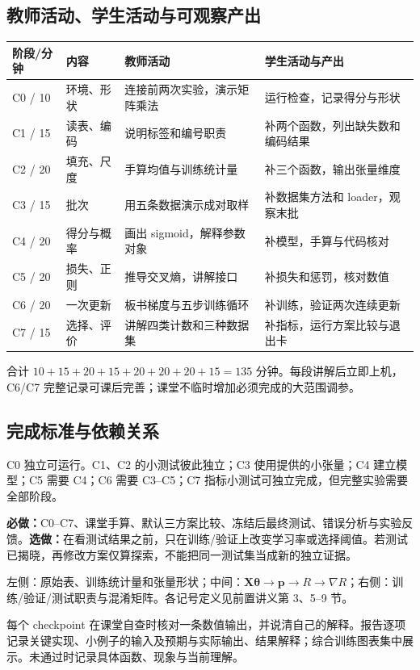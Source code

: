 \documentclass[UTF8,a4paper,11pt,fontset=fandol]{ctexart}
\begin{document}
\subsection{教师活动、学生活动与可观察产出}
\par\noindent\begin{tabularx}{\linewidth}{L{1.8cm}L{2.2cm}Y Y}
\toprule 阶段/分钟 & 内容 & 教师活动 & 学生活动与产出\\\midrule
C0 / 10 & 环境、形状 & 连接前两次实验，演示矩阵乘法 & 运行检查，记录得分与形状\\
C1 / 15 & 读表、编码 & 说明标签和编号职责 & 补两个函数，列出缺失数和编码结果\\
C2 / 20 & 填充、尺度 & 手算均值与训练统计量 & 补三个函数，输出张量维度\\
C3 / 15 & 批次 & 用五条数据演示成对取样 & 补数据集方法和 loader，观察末批\\
C4 / 20 & 得分与概率 & 画出 sigmoid，解释参数对象 & 补模型，手算与代码核对\\
C5 / 20 & 损失、正则 & 推导交叉熵，讲解接口 & 补损失和惩罚，核对数值\\
C6 / 20 & 一次更新 & 板书梯度与五步训练循环 & 补训练，验证两次连续更新\\
C7 / 15 & 选择、评价 & 讲解四类计数和三种数据集 & 补指标，运行方案比较与退出卡\\\bottomrule
\end{tabularx}
\medskip
合计 $10+15+20+15+20+20+20+15=135$ 分钟。每段讲解后立即上机，C6/C7 完整记录可课后完善；课堂不临时增加必须完成的大范围调参。
\subsection{完成标准与依赖关系}
C0 独立可运行。C1、C2 的小测试彼此独立；C3 使用提供的小张量；C4 建立模型；C5 需要 C4；C6 需要 C3--C5；C7 指标小测试可独立完成，但完整实验需要全部阶段。

\textbf{必做：}C0--C7、课堂手算、默认三方案比较、冻结后最终测试、错误分析与实验反馈。\textbf{选做：}在看测试结果之前，只在训练/验证上改变学习率或选择阈值。若测试已揭晓，再修改方案仅算探索，不能把同一测试集当成新的独立证据。
\begin{teacherbox}[建议板书]
左侧：原始表、训练统计量和张量形状；中间：$\mathbf X\boldsymbol\theta\to\mathbf p\to R\to\nabla R$；右侧：训练/验证/测试职责与混淆矩阵。各记号定义见前置讲义第 3、5--9 节。
\end{teacherbox}
\begin{questionbox}[检查规则]
每个 checkpoint 在课堂自查时核对一条数值输出，并说清自己的解释。报告逐项记录关键实现、小例子的输入及预期与实际输出、结果解释；综合训练图表集中展示。未通过时记录具体函数、现象与当前理解。
\end{questionbox}
\clearpage
\end{document}
